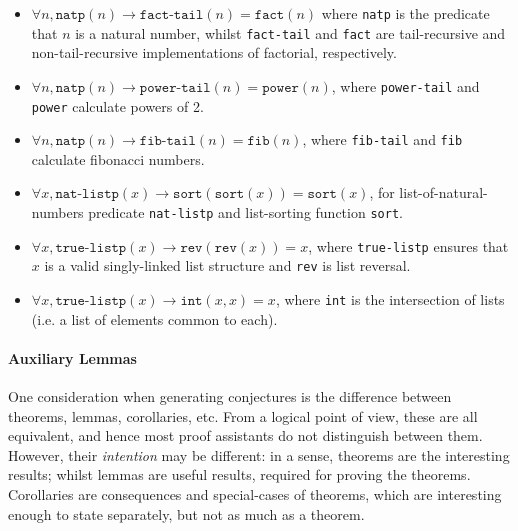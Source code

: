 \begin{itemize}
\item
  $\forall n, \texttt{natp}(n) \rightarrow \texttt{fact-tail}(n) =
  \texttt{fact}(n)$ where \texttt{natp} is the predicate that $n$ is a natural
  number, whilst \texttt{fact-tail} and \texttt{fact} are tail-recursive and
  non-tail-recursive implementations of factorial, respectively.

\item
  $\forall n, \texttt{natp}(n) \rightarrow \texttt{power-tail}(n) =
  \texttt{power}(n)$, where \texttt{power-tail} and \texttt{power} calculate
  powers of 2.

\item
  $\forall n, \texttt{natp}(n) \rightarrow \texttt{fib-tail}(n) =
  \texttt{fib}(n)$, where \texttt{fib-tail} and \texttt{fib} calculate fibonacci
  numbers.

\item
  $\forall x, \texttt{nat-listp}(x) \rightarrow \texttt{sort}(\texttt{sort}(x))
  = \texttt{sort}(x)$, for list-of-natural-numbers predicate \texttt{nat-listp}
  and list-sorting function \texttt{sort}.

\item
  $\forall x, \texttt{true-listp}(x) \rightarrow \texttt{rev}(\texttt{rev}(x)) =
  x$, where \texttt{true-listp} ensures that $x$ is a valid singly-linked list
  structure and \texttt{rev} is list reversal.

\item $\forall x, \texttt{true-listp}(x) \rightarrow \texttt{int}(x, x) = x$,
  where \texttt{int} is the intersection of lists (i.e. a list of elements
  common to each).
\end{itemize}

\paragraph{Auxiliary Lemmas} \label{sec:auxiliarylemmas}

One consideration when generating conjectures is the difference between
theorems, lemmas, corollaries, etc. From a logical point of view, these are all
equivalent, and hence most proof assistants do not distinguish between
them. However, their \emph{intention} may be different: in a sense, theorems are
the interesting results; whilst lemmas are useful results, required for proving
the theorems. Corollaries are consequences and special-cases of theorems, which
are interesting enough to state separately, but not as much as a theorem.

